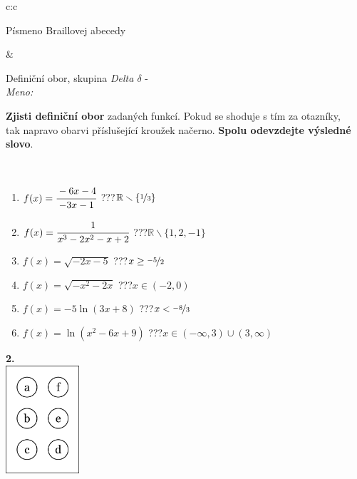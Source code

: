 \documentclass[10pt]{report}
\begin{document}
\begin{tabular}{c:c}
\begin{minipage}[c][104.5mm][t]{0.5\linewidth}
\begin{center}
\begin{minipage}{0.20\linewidth}
\begin{center}
{\small Písmeno Braillovej abecedy}
\end{center}
\end{minipage}
\end{center}
\end{minipage}
&
\begin{minipage}[c][104.5mm][t]{0.5\linewidth}
\begin{center}
\vspace{7mm}
{\huge Definiční obor, skupina \textit{Delta $\delta$} -}\\[5mm]
\textit{Meno:}\phantom{xxxxxxxxxxxxxxxxxxxxxxxxxxxxxxxxxxxxxxxxxxxxxxxxxxxxxxxxxxxxxxxxx}\\[5mm]
\begin{minipage}{0.95\linewidth}
\textbf{Zjisti definiční obor} zadaných funkcí. Pokud se shoduje s tím za otazníky,\\tak napravo obarvi příslušející kroužek načerno. \textbf{Spolu odevzdejte výsledné slovo}.
\end{minipage}
\\[1mm]
\begin{minipage}{0.79\linewidth}
\begin{center}
\begin{varwidth}{\linewidth}
\begin{enumerate}
\normalsizerrr
\item $f(x)=\cfrac{-6x-4}{-3x-1}$\quad \dotfill\; ???\;\dotfill \quad $\mathbb{R}\smallsetminus\{\nicefrac{1}{3}\}$
\item $f(x)=\cfrac{1}{x^3-2x^2-x+2}$\quad \dotfill\; ???\;\dotfill \quad $\mathbb{R}\smallsetminus\{1,2,-1\}$
\item $f(x)=\sqrt{-2x-5}$\quad \dotfill\; ???\;\dotfill \quad $x\geq\nicefrac{-5}{2}$
\item $f(x)=\sqrt{-x^2-2x}$\quad \dotfill\; ???\;\dotfill \quad $x\in(-2 , 0)$
\item $f(x)=-5\ln{(3x+8)}$\quad \dotfill\; ???\;\dotfill \quad $x<\nicefrac{-8}{3}$
\item $f(x)=\ln{(x^2-6x+9)}$\quad \dotfill\; ???\;\dotfill \quad $x\in(-\infty , 3)\cup(3 , \infty)$
\end{enumerate}
\end{varwidth}
\end{center}
\end{minipage}
\begin{minipage}{0.20\linewidth}
\begin{center}
{\Huge\bfseries 2.} \\[2mm]
\includegraphics[height=40mm]{../images/braille.png}

\end{center}
\end{minipage}
\end{center}
\end{minipage}
\end{tabular}
\end{document}
